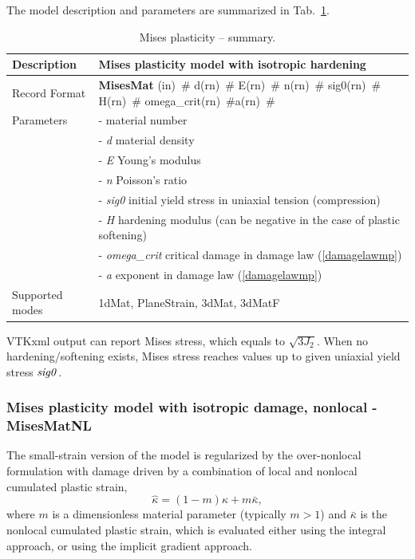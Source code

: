 \documentclass[a4paper]{article}
\newcommand{\descitem}[1]{{\noindent \bf #1}}
\newcommand{\elemparam}[2]{{{#1\tiny (#2)}~\#}}
\newcommand{\param}[1]{{\it #1}}
\begin{document}
The model description and parameters are summarized in Tab.~\ref{misesMat_table}.
\begin{table}[!htb]
\begin{tabular}{|l|p{9cm}|}
\hline
Description & Mises plasticity model with isotropic hardening\\
\hline
Record Format & \descitem{MisesMat}  \elemparam{}{in}
\elemparam{d}{rn} \elemparam{E}{rn} \elemparam{n}{rn} \elemparam{sig0}{rn} \elemparam{H}{rn} \elemparam{omega\_crit}{rn}\elemparam{a}{rn}\\
Parameters &- \param{} material number\\
&- \param{d} material density\\
&- \param{E} Young's modulus\\
&- \param{n} Poisson's ratio\\
&- \param{sig0} initial yield stress in uniaxial tension (compression)\\
&- \param{H} hardening modulus (can be negative in the case of plastic softening)\\
&- \param{omega\_crit} critical damage in damage law (\ref{damagelawmp})\\
&- \param{a} exponent in damage law (\ref{damagelawmp})\\
Supported modes& 1dMat, PlaneStrain, 3dMat, 3dMatF\\
\hline
\end{tabular}
\caption{Mises plasticity -- summary.}
\label{misesMat_table}
\end{table}

VTKxml output can report Mises stress, which equals to $\sqrt{3J_2}$. When no hardening/softening exists, Mises stress reaches values up to given uniaxial yield stress $\param{sig0}$. 

\subsubsection{Mises plasticity model with isotropic damage, nonlocal - MisesMatNL}
The small-strain version of the model is regularized by the over-nonlocal formulation with damage driven by a combination of local and nonlocal cumulated plastic strain,
\begin{equation}\label{overKappa1}
\hat{\kappa} = (1-m)\kappa + m\bar{\kappa},
\end{equation}
where $m$ is a dimensionless material parameter (typically $m>1$) and $\bar{\kappa}$ is the nonlocal cumulated plastic strain, which is evaluated either using the integral approach,
or using the implicit gradient approach.
\end{document}
